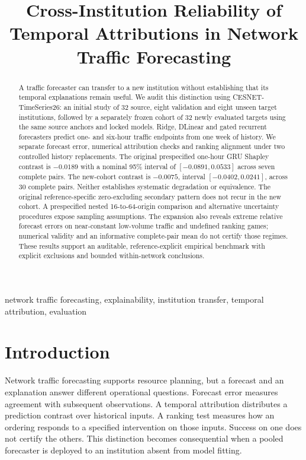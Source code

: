 \documentclass[conference]{IEEEtran}
\title{Cross-Institution Reliability of Temporal Attributions in Network Traffic Forecasting}
\author{\IEEEauthorblockN{Anonymous research draft}\IEEEauthorblockA{Expanded empirical draft, 7 November 2026; authors and venue to be finalized}}
\begin{document}
\maketitle
\begin{abstract}
A traffic forecaster can transfer to a new institution without establishing that its temporal explanations remain useful. We audit this distinction using CESNET-TimeSeries26: an initial study of 32 source, eight validation and eight unseen target institutions, followed by a separately frozen cohort of 32 newly evaluated targets using the same source anchors and locked models. Ridge, DLinear and gated recurrent forecasters predict one- and six-hour traffic endpoints from one week of history. We separate forecast error, numerical attribution checks and ranking alignment under two controlled history replacements. The original prespecified one-hour GRU Shapley contrast is $-0.0189$ with a nominal 95\% interval of $[-0.0891,0.0533]$ across seven complete pairs. The new-cohort contrast is $-0.0075$, interval $[-0.0402,0.0241]$, across 30 complete pairs. Neither establishes systematic degradation or equivalence. The original reference-specific zero-excluding secondary pattern does not recur in the new cohort. A prespecified nested 16-to-64-origin comparison and alternative uncertainty procedures expose sampling assumptions. The expansion also reveals extreme relative forecast errors on near-constant low-volume traffic and undefined ranking games; numerical validity and an informative complete-pair mean do not certify those regimes. These results support an auditable, reference-explicit empirical benchmark with explicit exclusions and bounded within-network conclusions.
\end{abstract}
\begin{IEEEkeywords}network traffic forecasting, explainability, institution transfer, temporal attribution, evaluation\end{IEEEkeywords}

\section{Introduction}
Network traffic forecasting supports resource planning, but a forecast and an explanation answer different operational questions. Forecast error measures agreement with subsequent observations. A temporal attribution distributes a prediction contrast over historical inputs. A ranking test measures how an ordering responds to a specified intervention on those inputs. Success on one does not certify the others. This distinction becomes consequential when a pooled forecaster is deployed to an institution absent from model fitting.
\end{document}
